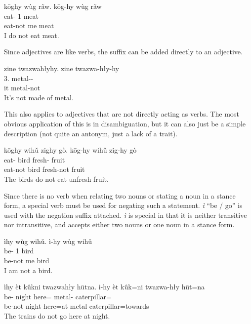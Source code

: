 \begin{exe}
    \ex
    \glt
    kōghy wùg rãw.
    \glll
    kōg-hy wùg rãw \\
    eat-\Neg{} 1\Sg{} meat \\
    eat-not me meat \\
    \glt
    I do not eat meat.
\end{exe}

Since adjectives are like verbs, the suffix can be added directly to an adjective.

\begin{exe}
    \ex
    \glt
    zine twazwahłyhy.
    \glll
    zine twazwa-hły-hy \\
    3\Sg{}.\Inanim{} metal-\Adj{}-\Neg{} \\
    it metal-not \\
    \glt
    It's not made of metal.
\end{exe}

This also applies to adjectives that are not directly acting as verbs.
The most obvious application of this is in disambiguation,
but it can also just be a simple description (not quite an antonym, just a lack of a trait).
\begin{exe}
    \ex
    \glt
    kōghy wihǔ zighy gò.
    \glll
    kōg-hy wihǔ zig-hy gò \\
    eat-\Neg{} bird fresh-\Neg{} fruit \\
    eat-not bird fresh-not fruit \\
    \glt
    The birds do not eat unfresh fruit.
\end{exe}

Since there is no verb when relating two nouns
or stating a noun in a stance form,
a special verb must be used for negating such a statement.
\textit{ì} ``be / go'' is used
with the negation suffix attached.
\textit{ì} is special in that
it is neither transitive nor intransitive,
and accepts either two nouns or one noun in a stance form.

\begin{exe}
    \ex
    \glt
    ìhy wùg wihǔ.
    \glll
    ì-hy wùg wihǔ \\
    be-\Neg{} 1\Sg{} bird \\
    be-not me bird \\
    \glt
    I am not a bird.
\end{exe}

\begin{exe}
    \ex
    \glt
    ìhy èt kûkni twazwahły hūtna.
    \glll
    ì-hy èt kûk=ni twazwa-hły hūt=na \\
    be-\Neg{} night here=\InessTwo{} metal-\Adj{} caterpillar=\AdessTwo{} \\
    be-not night here=at metal caterpillar=towards \\
    \glt
    The trains do not go here at night.
\end{exe}

